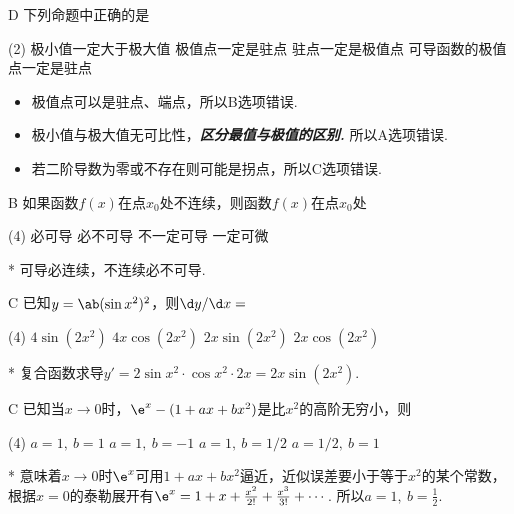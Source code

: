 \begin{choice}{D}
    下列命题中正确的是
    \begin{tasks}(2)
        \task 极小值一定大于极大值
        \task 极值点一定是驻点
        \task 驻点一定是极值点
        \task 可导函数的极值点一定是驻点
    \end{tasks}
\end{choice}
\begin{solution}
    \begin{itemize}
        \item 极值点可以是驻点、端点，所以B选项错误.
        \item 极小值与极大值无可比性，\emph{\textbf{区分最值与极值的区别.}} 所以A选项错误.
        \item 若二阶导数为零或不存在则可能是拐点，所以C选项错误. 
    \end{itemize}
\end{solution}

\begin{choice}{B}
    如果函数$f(x)$在点$x_0$处不连续，则函数$f(x)$在点$x_0$处
\begin{tasks}(4)
    \task 必可导
    \task 必不可导
    \task 不一定可导
    \task 一定可微
\end{tasks}
\end{choice}
\begin{solution}*
    可导必连续，不连续必不可导.
\end{solution}

\begin{choice}{C}
    已知$y=\ab(\sin x^2)^2$，则$\d y/\d x=$
\begin{tasks}(4)
    \task $4\sin(2x^2)$
    \task $4x\cos(2x^2)$
    \task $2x\sin(2x^2)$
    \task $2x\cos(2x^2)$
\end{tasks}
\end{choice}
\begin{solution}*
    复合函数求导$y'=2\sin x^2\cdot\cos x^2\cdot 2x=2x\sin(2x^2)$. 
\end{solution}

\begin{choice}{C}
    已知当$x\to 0$时，$\e^x-(1+ax+bx^2)$是比$x^2$的高阶无穷小，则
\begin{tasks}(4)
    \task $a=1,\ b=1$
    \task $a=1,\ b=-1$
    \task $a=1,\ b=1/2$
    \task $a=1/2,\ b=1$
\end{tasks}
\end{choice}
\begin{solution}*
    意味着$x\to 0$时$\e^x$可用$1+ax+bx^2$逼近，近似误差要小于等于$x^2$的某个常数，根据$x=0$的泰勒展开有$\e^x=1+x+\frac{x^2}{2!}+\frac{x^3}{3!}+\cdots$. 所以$a=1,\ b=\frac12$.
\end{solution}

